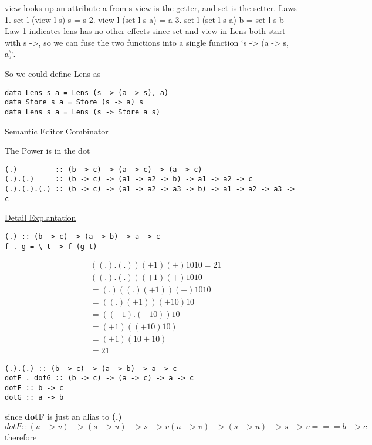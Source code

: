 view looks up an attribute a from s
view is the getter, and set is the setter.
Laws
1. set l (view l s) s = s
2. view l (set l s a) = a
3. set l (set l s a) b = set l s b
Law 1 indicates lens has no other effects
since set and view in Lens both start with s ->, so we can fuse the two functions into a single function
`s -> (a -> s, a)`.

So we could define Lens as
\begin{verbatim}
data Lens s a = Lens (s -> (a -> s), a)
data Store s a = Store (s -> a) s
data Lens s a = Lens (s -> Store a s)
\end{verbatim}


Semantic Editor Combinator

The Power is in the dot
\vspace{1mm}
\begin{verbatim}
(.)         :: (b -> c) -> (a -> c) -> (a -> c)
(.).(.)     :: (b -> c) -> (a1 -> a2 -> b) -> a1 -> a2 -> c
(.).(.).(.) :: (b -> c) -> (a1 -> a2 -> a3 -> b) -> a1 -> a2 -> a3 -> c
\end{verbatim}
\vspace{1mm}

\href{https://www.reddit.com/r/haskellquestions/comments/ayi445/help_me_understand_the_function_and_its_type}{Detail Explantation}

\begin{verbatim}
(.) :: (b -> c) -> (a -> b) -> a -> c
f . g = \ t -> f (g t)
\end{verbatim}


\begin{align*}
& ((.).(.)) (+1) (+) 10 10 = 21 \\
&  ((.).(.)) (+1) (+) 10 10 \\
& =  (.)((.) (+1)) (+) 10 10 \\
& =  ((.) (+1)) (+ 10) 10   \\
& = ((+1). (+10)) 10 \\
& = (+1) ((+10) 10) \\
& = (+1) (10 + 10) \\
& = 21
\end{align*}

\begin{verbatim}
(.).(.) :: (b -> c) -> (a -> b) -> a -> c
dotF . dotG :: (b -> c) -> (a -> c) -> a -> c
dotF :: b -> c
dotG :: a -> b
\end{verbatim}

since \textbf{dotF} is just an alias to  \textbf{(.)}
\begin{equation}
dotF :: (u -> v) -> (s -> u) -> s -> v
(u -> v) -> (s -> u) -> s -> v === b -> c
\end{equation}
therefore

